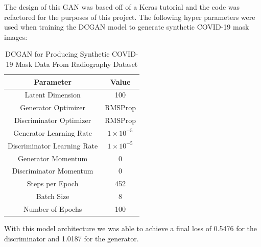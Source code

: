 The design of this GAN was based off of a Keras tutorial and the code was refactored for the purposes of this project\cite{DCGANKerasTutorial}.  The following hyper parameters were used when training the DCGAN model to generate synthetic COVID-19 mask images: 
\begin{table}[H]
    \centering
    \begin{tabular}{|c|c|}
    \hline
        Parameter
        & Value\\
         \hline
          Latent Dimension & 100\\
          Generator Optimizer & RMSProp \\
          Discriminator Optimizer & RMSProp\\
          Generator Learning Rate & $1\times10^{-5}$\\
          Discriminator Learning Rate & $1\times10^{-5}$\\
          Generator Momentum & 0\\
          Discriminator Momentum & 0\\
          Steps per Epoch & 452\\
          Batch Size & 8\\
          Number of Epochs & 100\\
         \hline
    \end{tabular}
    \caption{DCGAN for Producing Synthetic COVID-19 Mask Data From Radiography Dataset }
    \label{tab:DCGAN for Producing Synthetic COVID-19 Mask Data From Radiography Dataset}
\end{table}
With this model architecture we was able to achieve a final loss of 0.5476 for the discriminator and 1.0187 for the generator.
